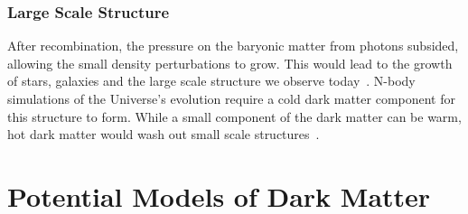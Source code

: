 \subsubsection*{Large Scale Structure}
After recombination, the pressure on the baryonic matter from photons subsided, allowing the small density perturbations to grow. This would lead to the growth of stars, galaxies and the large scale structure we observe today~\cite{Springel:2006vs_LargescalestructureUniverse}. N-body simulations of the Universe's evolution require a cold dark matter component for this structure to form. While a small component of the dark matter can be warm, hot dark matter would wash out small scale structures~\cite{Springel:2005nw_Simulatingjointevolution}.  

\section{Potential Models of Dark Matter}

